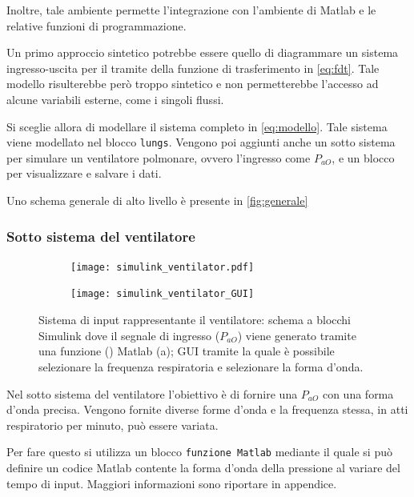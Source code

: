 Inoltre, tale ambiente permette l'integrazione con l'ambiente di Matlab e le relative funzioni di programmazione. 

Un primo approccio sintetico potrebbe essere quello di diagrammare un sistema ingresso-uscita per il tramite della funzione di trasferimento in \cref{eq:fdt}. Tale modello risulterebbe però troppo sintetico e non permetterebbe l'accesso ad alcune variabili esterne, come i singoli flussi.

Si sceglie allora di modellare il sistema completo in \cref{eq:modello}. Tale sistema viene modellato nel blocco \texttt{lungs}. Vengono poi aggiunti anche un sotto sistema per simulare un ventilatore polmonare, ovvero l'ingresso come $P_{aO}$, e un blocco per visualizzare e salvare i dati.

Uno schema generale di alto livello è presente in \cref{fig:generale}


\subsubsection{Sotto sistema del ventilatore}


\begin{figure}[t!]
	\centering
	\begin{subfigure}{0.4\linewidth}
		\centering
		\texttt{[image: simulink\_ventilator.pdf]}
		\caption{}
	\end{subfigure}\hfill
	\begin{subfigure}{0.6\linewidth}
		\centering
		\texttt{[image: simulink\_ventilator\_GUI]}
		\caption{}
		\label{fig:mask}
	\end{subfigure}\hfill
	\caption{Sistema di input rappresentante il ventilatore: schema a blocchi Simulink dove il segnale di ingresso ($P_{aO}$) viene generato tramite una funzione () Matlab (a); GUI tramite la quale è possibile selezionare la frequenza respiratoria e selezionare la forma d'onda.}
\end{figure}


Nel sotto sistema del ventilatore l'obiettivo è di fornire una $P_{aO}$ con una forma d'onda precisa. Vengono fornite diverse forme d'onda e la frequenza stessa, in atti respiratorio per minuto, può essere variata.

Per fare questo si utilizza un blocco \texttt{funzione Matlab} mediante il quale si può definire un codice Matlab contente la forma d'onda della pressione al variare del tempo di input. Maggiori informazioni sono riportare in appendice. 

